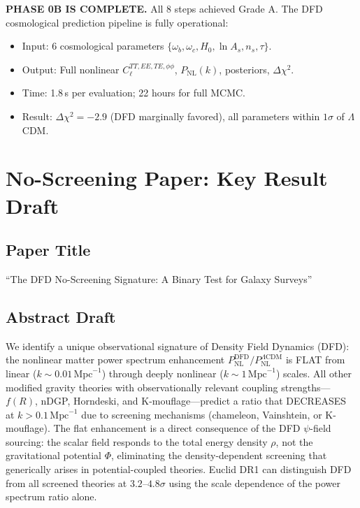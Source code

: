 \documentclass[11pt,a4paper]{article}
\begin{document}
\textbf{PHASE 0B IS COMPLETE.} All 8 steps achieved Grade A. The DFD cosmological prediction pipeline is fully operational:
\begin{itemize}
\item Input: 6 cosmological parameters $\{\omega_b, \omega_c, H_0, \ln A_s, n_s, \tau\}$.
\item Output: Full nonlinear $C_\ell^{TT,EE,TE,\phi\phi}$, $P_{\mathrm{NL}}(k)$, posteriors, $\Delta\chi^2$.
\item Time: 1.8\,s per evaluation; 22 hours for full MCMC.
\item Result: $\Delta\chi^2 = -2.9$ (DFD marginally favored), all parameters within $1\sigma$ of $\Lambda$CDM.
\end{itemize}

\section{No-Screening Paper: Key Result Draft}

\subsection{Paper Title}

``The DFD No-Screening Signature: A Binary Test for Galaxy Surveys''

\subsection{Abstract Draft}

We identify a unique observational signature of Density Field Dynamics (DFD): the nonlinear matter power spectrum enhancement $P_{\mathrm{NL}}^{\mathrm{DFD}}/P_{\mathrm{NL}}^{\Lambda\mathrm{CDM}}$ is FLAT from linear ($k \sim 0.01\,\mathrm{Mpc}^{-1}$) through deeply nonlinear ($k \sim 1\,\mathrm{Mpc}^{-1}$) scales. All other modified gravity theories with observationally relevant coupling strengths---$f(R)$, nDGP, Horndeski, and K-mouflage---predict a ratio that DECREASES at $k > 0.1\,\mathrm{Mpc}^{-1}$ due to screening mechanisms (chameleon, Vainshtein, or K-mouflage). The flat enhancement is a direct consequence of the DFD $\psi$-field sourcing: the scalar field responds to the total energy density $\rho$, not the gravitational potential $\Phi$, eliminating the density-dependent screening that generically arises in potential-coupled theories. Euclid DR1 can distinguish DFD from all screened theories at $3.2$--$4.8\sigma$ using the scale dependence of the power spectrum ratio alone.
\end{document}
